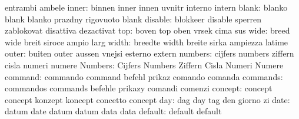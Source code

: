                            entrambi                  ambele
                    inner: binnen                    inner
                           innen                     uvnitr
                           interno                   intern
                    blank: blanko                    blank
                           blanko                    prazdny
                           rigovuoto                 blank
                  disable: blokkeer                  disable
                           sperren                   zablokovat
                           disattiva                 dezactivat
                      top: boven                     top
                           oben                      vrsek
                           cima                      sus
                     wide: breed                     wide
                           breit                     siroce
                           ampio                     larg
                    width: breedte                   width
                           breite                    sirka
                           ampiezza                  latime
                    outer: buiten                    outer
                           aussen                    vnejsi
                           esterno                   extern
                  numbers: cijfers                   numbers
                           ziffern                   cisla
                           numeri                    numere
                  Numbers: Cijfers                   Numbers
                           Ziffern                   Cisla
                           Numeri                    Numere
                  command: commando                  command
                           befehl                    prikaz
                           comando                   comanda
                 commands: commandos                 commands
                           befehle                   prikazy
                           comandi                   comenzi
                  concept: concept                   concept
                           konzept                   koncept
                           concetto                  concept
                      day: dag                       day
                           tag                       den
                           giorno                    zi
                     date: datum                     date
                           datum                     datum
                           data                      data
                  default: default                   default
